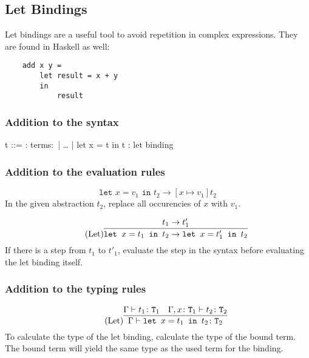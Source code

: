 \subsection{Let Bindings}
\label{subsec:let}

Let bindings are a useful tool to avoid repetition in complex expressions.
They are found in Haskell as well:

\begin{verbatim}
    add x y =
        let result = x + y
        in
            result
\end{verbatim}

\subsubsection{Addition to the syntax \cite{pierce2002ProgLang}}
\begin{bnfgrammar}
    t ::= : terms$\colon$
    | \dots
    | let x = t in t : let binding
\end{bnfgrammar}\leavevmode\newline

\subsubsection{Addition to the evaluation rules \cite{pierce2002ProgLang}}
\begin{equation*}
    \tag{Let-Bind Value}
    \texttt{let } x = v_1 \texttt{ in } t_2 \rightarrow [x \mapsto v_1] t_2
\end{equation*}
In the given abstraction $t_2$, replace all occurencies of $x$ with $v_1$.

\begin{equation*}
    \tag{Let}
    \infer{
        \texttt{let } x=t_1 \texttt{ in } t_2 \rightarrow \texttt{let } x=t'_1 \texttt{ in } t_2
    }{
        t_1 \rightarrow t'_1
    }
\end{equation*}
If there is a step from $t_1$ to $t'_1$, evaluate the step
in the syntax before evaluating the let binding itself.

\subsubsection{Addition to the typing rules \cite{pierce2002ProgLang}}
\begin{equation*}
    \tag{Let}
    \infer{
        \Gamma \vdash \texttt{let } x=t_1 \texttt{ in } t_2 \colon \texttt{T}_2
    }{
        \Gamma \vdash t_1 \colon \texttt{T}_1 & \Gamma , x \colon \texttt{T}_1 \vdash t_2 \colon \texttt{T}_2
    }
\end{equation*}
To calculate the type of the let binding, calculate the type of the bound term. The bound
term will yield the same type as the used term for the binding.
